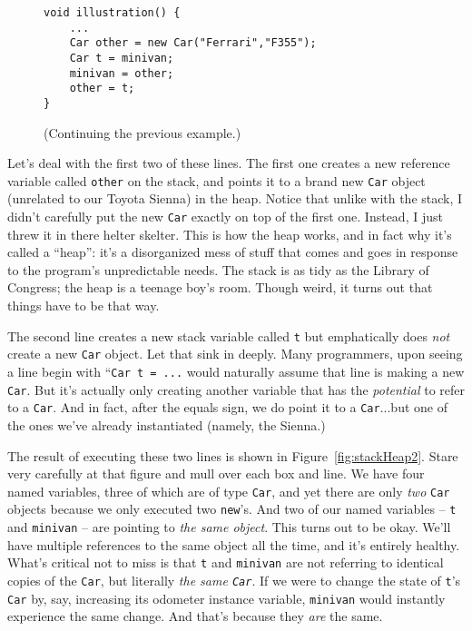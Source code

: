 \begin{figure}[ht]
\begin{Verbatim}[fontsize=\small,samepage=true,frame=single]
void illustration() {
    ...
    Car other = new Car("Ferrari","F355");
    Car t = minivan;
    minivan = other;
    other = t;
}
\end{Verbatim}
\caption{(Continuing the previous example.)}
\label{fig:additionalCode}
\end{figure}

Let's deal with the first two of these lines. The first one creates a new
reference variable called \texttt{other} on the stack, and points it to a
brand new \texttt{Car} object (unrelated to our Toyota Sienna) in the heap.
Notice that unlike with the stack, I didn't carefully put the new \texttt{Car}
exactly on top of the first one. Instead, I just threw it in there helter
skelter. This is how the heap works, and in fact why it's called a ``heap'':
it's a disorganized mess of stuff that comes and goes in response to the
program's unpredictable needs. The stack is as tidy as the Library of
Congress; the heap is a teenage boy's room. Though weird, it turns out that
things have to be that way.

The second line creates a new stack variable called \texttt{t} but
emphatically does \textit{not} create a new \texttt{Car} object. Let that sink
in deeply. Many programmers, upon seeing a line begin with ``\texttt{Car t =
...} would naturally assume that line is making a new \texttt{Car}. But it's
actually only creating another variable that has the \textit{potential} to
refer to a \texttt{Car}. And in fact, after the equals sign, we do point it to
a \texttt{Car}...but one of the ones we've already instantiated (namely, the
Sienna.)

The result of executing these two lines is shown in
Figure~\ref{fig:stackHeap2}. Stare very carefully at that figure and mull over
each box and line. We have four named variables, three of which are of type
\texttt{Car}, and yet there are only \textit{two} \texttt{Car} objects because
we only executed two \texttt{new}'s. And two of our named variables --
\texttt{t} and \texttt{minivan} -- are pointing to \textit{the same object}.
This turns out to be okay. We'll have multiple references to the same object
all the time, and it's entirely healthy. What's critical not to miss is that
\texttt{t} and \texttt{minivan} are not referring to identical copies of the
\texttt{Car}, but literally \textit{the same \texttt{Car}}. If we were to
change the state of \texttt{t}'s \texttt{Car} by, say, increasing its odometer
instance variable, \texttt{minivan} would instantly experience the same
change. And that's because they \textit{are} the same. 

